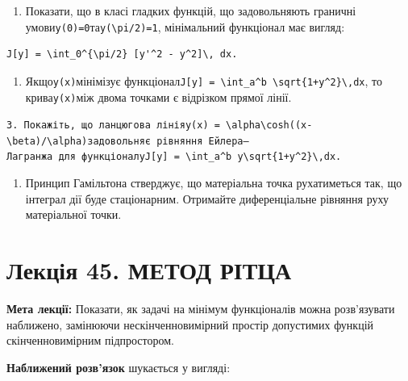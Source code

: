 \documentclass[
  ukrainian,
]{article}
\providecommand{\tightlist}{%
  \setlength{\itemsep}{0pt}\setlength{\parskip}{0pt}}
\begin{document}
\begin{enumerate}
\def\labelenumi{\arabic{enumi}.}
\tightlist
\item
  Показати, що в класі гладких функцій, що задовольняють граничні
  умови\texttt{y(0)=0}та\texttt{y(\textbackslash{}pi/2)=1}, мінімальний
  функціонал має вигляд:
\end{enumerate}

\begin{verbatim}
J[y] = \int_0^{\pi/2} [y'^2 - y^2]\, dx.
\end{verbatim}

\begin{enumerate}
\def\labelenumi{\arabic{enumi}.}
\setcounter{enumi}{1}
\tightlist
\item
  Якщо\texttt{y(x)}мінімізує
  функціонал\texttt{J{[}y{]}\ =\ \textbackslash{}int\_a\^{}b\ \textbackslash{}sqrt\{1+y\textquotesingle{}\^{}2\}\textbackslash{},dx},
  то крива\texttt{y(x)}між двома точками є відрізком прямої лінії.
\end{enumerate}

\texttt{3.\ Покажіть,\ що\ ланцюгова\ лінія\textquotesingle{}y(x)\ =\ \textbackslash{}alpha\textbackslash{}cosh((x-\textbackslash{}beta)/\textbackslash{}alpha)\textquotesingle{}задовольняє\ рівняння\ Ейлера–Лагранжа\ для\ функціоналу\textquotesingle{}J{[}y{]}\ =\ \textbackslash{}int\_a\^{}b\ y\textbackslash{}sqrt\{1+y\textquotesingle{}\^{}2\}\textbackslash{},dx\textquotesingle{}.}

\begin{enumerate}
\def\labelenumi{\arabic{enumi}.}
\setcounter{enumi}{3}
\tightlist
\item
  Принцип Гамільтона стверджує, що матеріальна точка рухатиметься так,
  що інтеграл дії буде стаціонарним. Отримайте диференціальне рівняння
  руху матеріальної точки.
\end{enumerate}

\section{Лекція 45. МЕТОД
РІТЦА}\label{ux43bux435ux43aux446ux456ux44f-45.-ux43cux435ux442ux43eux434-ux440ux456ux442ux446ux430}

\textbf{Мета лекції:} Показати, як задачі на мінімум функціоналів можна
розв'язувати наближено, замінюючи нескінченновимірний простір допустимих
функцій скінченновимірним підпростором.

\textbf{Наближений розв'язок} шукається у вигляді:
\end{document}
